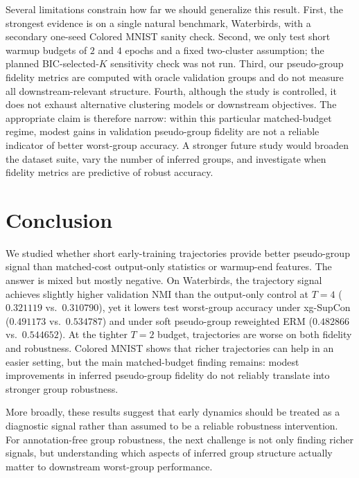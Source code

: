 \documentclass{article}
\newcommand{\nmi}{\textsc{NMI}}
\begin{document}
Several limitations constrain how far we should generalize this result. First, the strongest evidence is on a single natural benchmark, Waterbirds, with a secondary one-seed Colored MNIST sanity check. Second, we only test short warmup budgets of $2$ and $4$ epochs and a fixed two-cluster assumption; the planned BIC-selected-$K$ sensitivity check was not run. Third, our pseudo-group fidelity metrics are computed with oracle validation groups and do not measure all downstream-relevant structure. Fourth, although the study is controlled, it does not exhaust alternative clustering models or downstream objectives. The appropriate claim is therefore narrow: within this particular matched-budget regime, modest gains in validation pseudo-group fidelity are not a reliable indicator of better worst-group accuracy. A stronger future study would broaden the dataset suite, vary the number of inferred groups, and investigate when fidelity metrics are predictive of robust accuracy.

\section{Conclusion}
\label{sec:conclusion}
We studied whether short early-training trajectories provide better pseudo-group signal than matched-cost output-only statistics or warmup-end features. The answer is mixed but mostly negative. On Waterbirds, the trajectory signal achieves slightly higher validation \nmi{} than the output-only control at $T=4$ ($0.321119$ vs.\ $0.310790$), yet it lowers test worst-group accuracy under xg-SupCon ($0.491173$ vs.\ $0.534787$) and under soft pseudo-group reweighted ERM ($0.482866$ vs.\ $0.544652$). At the tighter $T=2$ budget, trajectories are worse on both fidelity and robustness. Colored MNIST shows that richer trajectories can help in an easier setting, but the main matched-budget finding remains: modest improvements in inferred pseudo-group fidelity do not reliably translate into stronger group robustness.

More broadly, these results suggest that early dynamics should be treated as a diagnostic signal rather than assumed to be a reliable robustness intervention. For annotation-free group robustness, the next challenge is not only finding richer signals, but understanding which aspects of inferred group structure actually matter to downstream worst-group performance.
\end{document}
